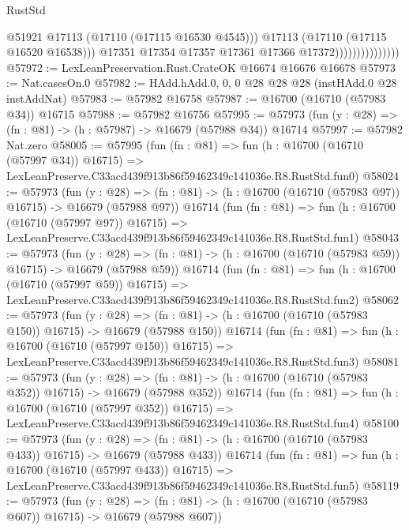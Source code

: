 \begin{lexlean}{RustStd}
\begin{coremodule}
                                      @51921
                                      @17113
                                      (@17110 (@17115 @16530 @4545)))
                                    @17113
                                    (@17110 (@17115 @16520 @16538)))
                                  @17351
                                  @17354
                                  @17357
                                  @17361
                                  @17366
                                  @17372)))))))))))))))
@57972 := LexLeanPreservation.Rust.CrateOK @16674 @16676 @16678
@57973 := Nat.casesOn.{0}
@57982 := HAdd.hAdd.{0, 0, 0} @28 @28 @28 (instHAdd.{0} @28 instAddNat)
@57983 := @57982 @16758
@57987 := @16700 (@16710 (@57983 @34)) @16715
@57988 := @57982 @16756
@57995 := @57973 (fun (y : @28) => (fn : @81) -> (h : @57987) -> @16679 (@57988 @34)) @16714
@57997 := @57982 Nat.zero
@58005 := @57995
    (fun (fn : @81) =>
    fun (h : @16700 (@16710 (@57997 @34)) @16715) =>
    LexLeanPreserve.C33acd439f913b86f59462349c141036e.R8.RustStd.fun0)
@58024 := @57973
    (fun (y : @28) =>
    (fn : @81) -> (h : @16700 (@16710 (@57983 @97)) @16715) -> @16679 (@57988 @97))
    @16714
    (fun (fn : @81) =>
    fun (h : @16700 (@16710 (@57997 @97)) @16715) =>
    LexLeanPreserve.C33acd439f913b86f59462349c141036e.R8.RustStd.fun1)
@58043 := @57973
    (fun (y : @28) =>
    (fn : @81) -> (h : @16700 (@16710 (@57983 @59)) @16715) -> @16679 (@57988 @59))
    @16714
    (fun (fn : @81) =>
    fun (h : @16700 (@16710 (@57997 @59)) @16715) =>
    LexLeanPreserve.C33acd439f913b86f59462349c141036e.R8.RustStd.fun2)
@58062 := @57973
    (fun (y : @28) =>
    (fn : @81) -> (h : @16700 (@16710 (@57983 @150)) @16715) -> @16679 (@57988 @150))
    @16714
    (fun (fn : @81) =>
    fun (h : @16700 (@16710 (@57997 @150)) @16715) =>
    LexLeanPreserve.C33acd439f913b86f59462349c141036e.R8.RustStd.fun3)
@58081 := @57973
    (fun (y : @28) =>
    (fn : @81) -> (h : @16700 (@16710 (@57983 @352)) @16715) -> @16679 (@57988 @352))
    @16714
    (fun (fn : @81) =>
    fun (h : @16700 (@16710 (@57997 @352)) @16715) =>
    LexLeanPreserve.C33acd439f913b86f59462349c141036e.R8.RustStd.fun4)
@58100 := @57973
    (fun (y : @28) =>
    (fn : @81) -> (h : @16700 (@16710 (@57983 @433)) @16715) -> @16679 (@57988 @433))
    @16714
    (fun (fn : @81) =>
    fun (h : @16700 (@16710 (@57997 @433)) @16715) =>
    LexLeanPreserve.C33acd439f913b86f59462349c141036e.R8.RustStd.fun5)
@58119 := @57973
    (fun (y : @28) =>
    (fn : @81) -> (h : @16700 (@16710 (@57983 @607)) @16715) -> @16679 (@57988 @607))

\end{coremodule}
\end{lexlean}
